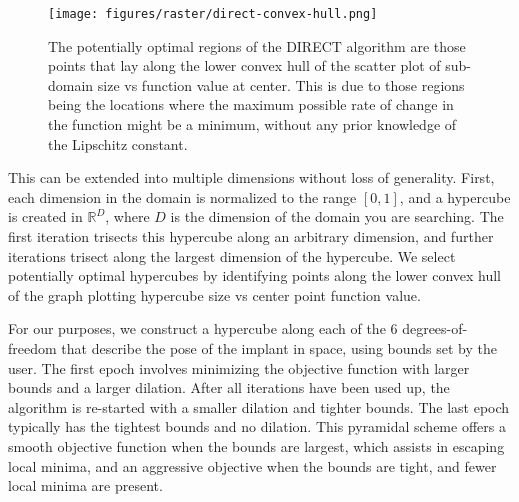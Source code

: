 \begin{figure}[h!]
    \begin{center}
      \texttt{[image: figures/raster/direct-convex-hull.png]}
    \end{center}
    \caption[The potentially optimal regions of the DIRECT algorithm are those points that lay along the lower convex hull of the scatter plot of sub-domain size vs function value at center]{The potentially optimal regions of the DIRECT algorithm are those points that lay along the lower convex hull of the scatter plot of sub-domain size vs function value at center. This is due to those regions being the locations where the maximum possible rate of change in the function might be a minimum, without any prior knowledge of the Lipschitz constant.}
    \label{fig:direct-convex-hull}
\end{figure}

This can be extended into multiple dimensions without loss of generality. First, each dimension in the domain is normalized to the range $[0,1]$, and a hypercube is created in $\mathbb{R}^D$, where $D$ is the dimension of the domain you are searching. The first iteration trisects this hypercube along an arbitrary dimension, and further iterations trisect along the largest dimension of the hypercube. We select potentially optimal hypercubes by identifying points along the lower convex hull of the graph plotting hypercube size vs center point function value.


For our purposes, we construct a hypercube along each of the 6 degrees-of-freedom that describe the pose of the implant in space, using bounds set by the user. The first epoch involves minimizing the objective function with larger bounds and a larger dilation. After all iterations have been used up, the algorithm is re-started with a smaller dilation and tighter bounds. The last epoch typically has the tightest bounds and no dilation. This pyramidal scheme offers a smooth objective function when the bounds are largest, which assists in escaping local minima, and an aggressive objective when the bounds are tight, and fewer local minima are present.

